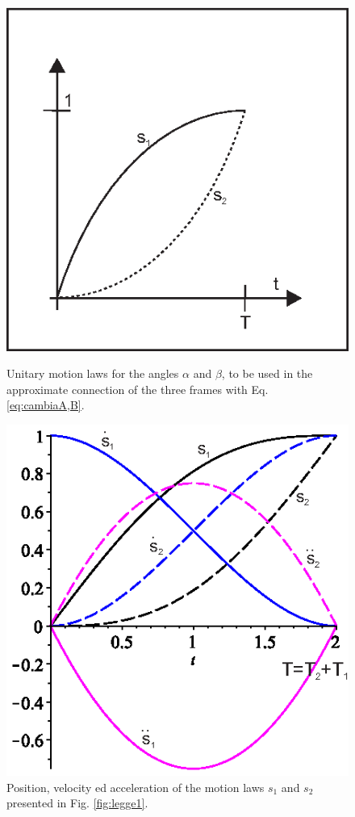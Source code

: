 \begin{figure}[tbp]
    \begin{minipage}[t]{0.49\textwidth}
        \centering
        \includegraphics{figures/Legge1}
        \caption{Unitary motion laws for the angles $\alpha$ and $\beta$, to be used in the approximate connection of the three frames with Eq. \ref{eq:cambiaA,B}.}
        \label{fig:legge1}
    \end{minipage}
    \hfill
    \begin{minipage}[t]{0.49\textwidth}
        \centering
        \includegraphics{figures/legge5sva-j}
        \caption{Position, velocity ed acceleration of the motion laws $s_1$ and $s_2$ presented in Fig. \ref{fig:legge1}.}
        \label{fig:legge1sva}
    \end{minipage}
\end{figure}


